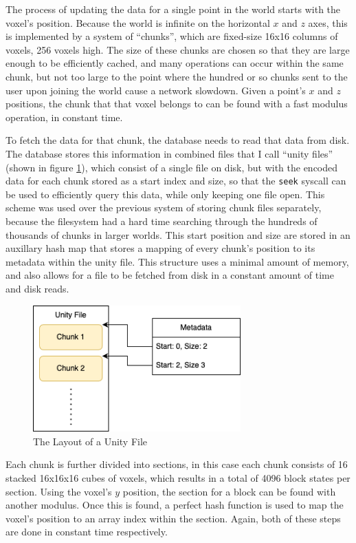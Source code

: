\documentclass[10pt,twocolumn]{article}
\begin{document}
The process of updating the data for a single point in the world starts with the
voxel's position. Because the world is infinite on the horizontal $x$ and $z$
axes, this is implemented by a system of ``chunks'', which are fixed-size 16x16
columns of voxels, 256 voxels high. The size of these chunks are chosen so that
they are large enough to be efficiently cached, and many operations can occur
within the same chunk, but not too large to the point where the hundred or so
chunks sent to the user upon joining the world cause a network slowdown. Given a
point's $x$ and $z$ positions, the chunk that that voxel belongs to can be found
with a fast modulus operation, in constant time.

To fetch the data for that chunk, the database needs to read that data from
disk. The database stores this information in combined files that I call ``unity
files'' (shown in figure \ref{fig:unity}), which consist of a single file on disk, but with the encoded data for
each chunk stored as a start index and size, so that the \verb|seek| syscall can
be used to efficiently query this data, while only keeping one file open. This
scheme was used over the previous system of storing chunk files separately,
because the filesystem had a hard time searching through the hundreds of
thousands of chunks in larger worlds. This start position and size are stored in
an auxillary hash map that stores a mapping of every chunk's position to its
metadata within the unity file. This structure uses a minimal amount of memory,
and also allows for a file to be fetched from disk in a constant amount of time
and disk reads.

\begin{figure}
  \centering
  \includegraphics[width=8cm]{unity-file.drawio.png}
  \caption{The Layout of a Unity File}
  \label{fig:unity}
\end{figure}

Each chunk is further divided into sections, in this case each chunk consists of
16 stacked 16x16x16 cubes of voxels, which results in a total of 4096 block
states per section. Using the voxel's $y$ position, the section for a block can
be found with another modulus. Once this is found, a perfect hash function is
used to map the voxel's position to an array index within the section. Again,
both of these steps are done in constant time respectively.
\end{document}
